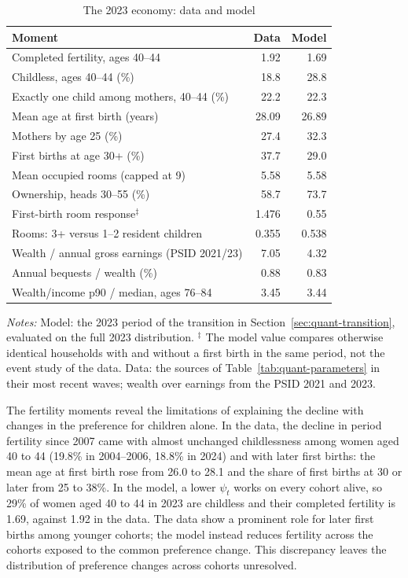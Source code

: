 \begin{table}[t]
\centering
\caption{The 2023 economy: data and model}
\label{tab:quant-2023}
\small
\begin{tabularx}{\textwidth}{@{}Xrr@{}}
\toprule
Moment & Data & Model \\
\midrule
Completed fertility, ages 40--44 & 1.92 & 1.69 \\
Childless, ages 40--44 (\%) & 18.8 & 28.8 \\
Exactly one child among mothers, 40--44 (\%) & 22.2 & 22.3 \\
Mean age at first birth (years) & 28.09 & 26.89 \\
Mothers by age 25 (\%) & 27.4 & 32.3 \\
First births at age 30+ (\%) & 37.7 & 29.0 \\
\addlinespace
Mean occupied rooms (capped at 9) & 5.58 & 5.58 \\
Ownership, heads 30--55 (\%) & 58.7 & 73.7 \\
First-birth room response$^{\ddagger}$ & 1.476 & 0.55 \\
Rooms: 3+ versus 1--2 resident children & 0.355 & 0.538 \\
\addlinespace
Wealth / annual gross earnings (PSID 2021/23) & 7.05 & 4.32 \\
Annual bequests / wealth (\%) & 0.88 & 0.83 \\
Wealth/income p90 / median, ages 76--84 & 3.45 & 3.44 \\
\bottomrule
\end{tabularx}
\par\smallskip
\begin{minipage}{0.95\linewidth}
\footnotesize\textit{Notes:} Model: the 2023 period of the transition in
Section~\ref{sec:quant-transition}, evaluated on the full 2023 distribution. $^{\ddagger}$ The model
value compares otherwise identical households with and without a first birth
in the same period, not the event study of the data. Data: the sources of
Table~\ref{tab:quant-parameters} in their most recent waves; wealth over earnings
from the PSID 2021 and 2023.
\end{minipage}
\end{table}

The fertility moments reveal the limitations of explaining the decline with
changes in the preference for children alone. In the data, the decline
in period fertility since 2007 came with almost unchanged childlessness among
women aged 40 to 44 (19.8\% in 2004--2006, 18.8\% in 2024) and
with later first births: the mean age at first birth rose from 26.0 to 28.1
and the share of first births at 30 or later from 25 to 38\%. In the
model, a lower $\psi_t$ works on every cohort alive, so 29\% of women
aged 40 to 44 in 2023 are childless and their completed fertility is 1.69,
against 1.92 in the data. The data
show a prominent role for later first births among younger cohorts; the
model instead reduces fertility across the cohorts exposed to the common
preference change. This discrepancy leaves the distribution of preference changes across
cohorts unresolved.

